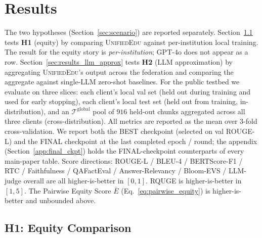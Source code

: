 \documentclass[11pt]{article}
\theoremstyle{plain}
\theoremstyle{definition}
\theoremstyle{remark}
\newcommand{\UniEdu}{\textsc{UnifiedEdu}}
\begin{document}
\section{Results}
\label{sec:results}

The two hypotheses (Section~\ref{sec:scenario}) are
reported separately. Section~\ref{sec:results_equity}
tests \textbf{H1} (equity) by comparing \UniEdu{}
against per-institution local training. The result for the equity story is
\emph{per-institution}; GPT-4o does not appear as a
row. Section~\ref{sec:results_llm_approx} tests
\textbf{H2} (LLM approximation) by aggregating
\UniEdu{}'s output across the federation and
comparing the aggregate against single-LLM zero-shot
baselines. For the public testbed we evaluate on
three slices: each client's local val set (held out
during training and used for early stopping), each
client's local test set (held out from training,
in-distribution), and an
$\mathcal{T}^{\text{global}}$ pool of $916$
held-out chunks aggregated across all three clients
(cross-distribution). All metrics are reported as
the mean over 3-fold cross-validation. We report
both the BEST checkpoint (selected on val ROUGE-L)
and the FINAL checkpoint at the last completed
epoch / round; the appendix
(Section~\ref{app:final_ckpt}) holds the FINAL-checkpoint
counterparts of every main-paper table. Score
directions: ROUGE-L / BLEU-4 / BERTScore-F1 / RTC /
Faithfulness / QAFactEval / Answer-Relevancy /
Bloom-EVS / LLM-judge overall are all
higher-is-better in $[0, 1]$. RQUGE is
higher-is-better in $[1, 5]$. The Pairwise Equity
Score $\bar{E}$ (Eq.~\ref{eq:pairwise_equity}) is
higher-is-better and unbounded above.

\subsection{H1: Equity Comparison}
\label{sec:results_equity}
\end{document}
